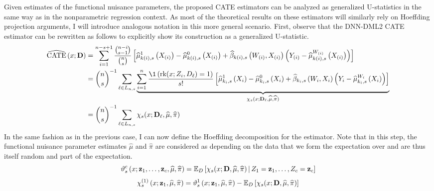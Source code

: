 Given estimates of the functional nuisance parameters, the proposed CATE estimators can be analyzed as generalized U-statistics in the same way as in the nonparametric regression context.
As most of the theoretical results on these estimators will similarly rely on Hoeffding projection arguments, I will introduce analogous notation in this more general scenario.
First, observe that the DNN-DML2 CATE estimator can be rewritten as follows to explicitly show its construction as a generalized U-statistic.
\begin{equation}
    \begin{aligned}
        \widehat{\operatorname{CATE}}\left(x; \mathbf{D}\right) 
        & = \sum_{i = 1}^{n - s + 1} \frac{\binom{n-i}{s-1}}{\binom{n}{s}}
		\left[\hat{\mu}_{k(i),s}^{1}\left(X_{(i)}\right) - \hat{\mu}_{k(i),s}^{0}\left(X_{(i)}\right) + \hat{\beta}_{k(i),s}\left(W_{(i)}, X_{(i)}\right)\left(Y_{(i)} - \hat{\mu}^{W_{(i)}}_{k(i),s}\left(X_{(i)}\right)\right)\right] \\
        & = \binom{n}{s}^{-1} \sum_{\ell \in L_{n,s}}
        \underbrace{\sum_{i = 1}^{n}\frac{\1\left(\rk(x; Z_{i}, D_{\ell}) = 1\right)}{s!} 
        \left[\hat{\mu}_{k_i,s}^{1}\left(X_{i}\right) - \hat{\mu}_{k_i,s}^{0}\left(X_{i}\right) + \hat{\beta}_{k_i,s}\left(W_{i}, X_{i}\right)\left(Y_{i} - \hat{\mu}^{W_{i}}_{k_i,s}\left(X_{i}\right)\right)\right]}_{\chi_{s}(x; \mathbf{D}_{\ell}, \hat{\mu}, \hat{\pi})} \\
        & = \binom{n}{s}^{-1} \sum_{\ell \in L_{n,s}}\chi_{s}(x; \mathbf{D}_{\ell}, \hat{\mu}, \hat{\pi})
    \end{aligned}
\end{equation}
In the same fashion as in the previous case, I can now define the Hoeffding decomposition for the estimator.
Note that in this step, the functional nuisance parameter estimates $\hat{\mu}$ and $\hat{\pi}$ are considered as depending on the data that we form the expectation over and are thus itself random and part of the expectation.
\begin{equation}
    \vartheta_{s}^{c}\left(x; \mathbf{z}_{1}, \dotsc, \mathbf{z}_{c}, \widehat{\mu}, \widehat{\pi}\right)
    = \mathbb{E}_{D}\left[\chi_{s}(x; \mathbf{D}, \widehat{\mu}, \widehat{\pi}) \, \middle| \, Z_1 = \mathbf{z}_1, \dotsc, Z_c = \mathbf{z}_c\right]
\end{equation}
\begin{equation}
    \chi_{s}^{(1)}\left(x; \mathbf{z}_{1}, \widehat{\mu}, \widehat{\pi}\right)
	= \vartheta_{s}^{1}\left(x; \mathbf{z}_{1}, \widehat{\mu}, \widehat{\pi}\right)
    - \mathbb{E}_{D}\left[\chi_{s}(x; \mathbf{D}, \widehat{\mu}, \widehat{\pi})\right]
\end{equation}
